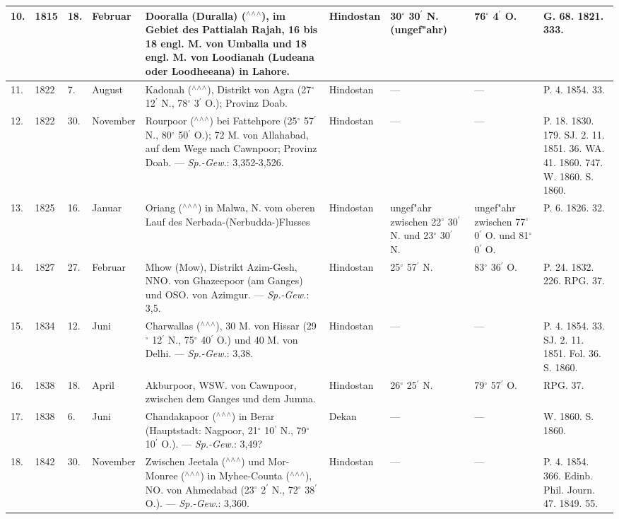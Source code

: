 \documentclass[a4paper, 8pt, oneside, polutonikogreek, german]{article}
\begin{document}
\begin{center}
\begin{longtable}{|p{3mm}|p{8mm}|p{5mm}|p{18mm}|p{25mm}|p{15mm}|p{13mm}|p{13mm}|p{13mm}|}
        10. & 1815 & 18. & Februar & Dooralla (Duralla) ($^\wedge$$^\wedge$$^\wedge$), im Gebiet des Pattialah Rajah, 16 bis 18 engl. M. von Umballa und 18 engl. M. von Loodianah (Ludeana oder Loodheeana) in Lahore. & Hindostan & 30$^\circ$ 30$^\prime$ N. (ungef"ahr) & 76$^\circ$ 4$^\prime$ O. & G. 68. 1821. 333. \\ \hline
        11. & 1822 & 7. & August & Kadonah ($^\wedge$$^\wedge$$^\wedge$), Distrikt von Agra (27$^\circ$ 12$^\prime$ N., 78$^\circ$ 3$^\prime$ O.); Provinz Doab. & Hindostan & --- & --- & P. 4. 1854. 33. \\ \hline
        12. & 1822 & 30. & November & Rourpoor ($^\wedge$$^\wedge$$^\wedge$) bei Fattehpore (25$^\circ$ 57$^\prime$ N., 80$^\circ$ 50$^\prime$ O.); 72 M. von Allahabad, auf dem Wege nach Cawnpoor; Provinz Doab. --- \emph{Sp.-Gew.}: 3,352-3,526. & Hindostan & --- & --- & P. 18. 1830. 179. SJ. 2. 11. 1851. 36. WA. 41. 1860. 747. W. 1860. S. 1860. \\ \hline
        13. & 1825 & 16. & Januar & Oriang ($^\wedge$$^\wedge$$^\wedge$) in Malwa, N. vom oberen Lauf des Nerbada-(Nerbudda-)Flusses & Hindostan & ungef"ahr zwischen 22$^\circ$ 30$^\prime$ N. und 23$^\circ$ 30$^\prime$ N. & ungef"ahr zwischen 77$^\circ$ 0$^\prime$ O. und 81$^\circ$ 0$^\prime$ O. & P. 6. 1826. 32. \\ \hline
        14. & 1827 & 27. & Februar & Mhow (Mow), Distrikt Azim-Gesh, NNO. von Ghazeepoor (am Ganges) und OSO. von Azimgur. --- \emph{Sp.-Gew.}: 3,5. & Hindostan & 25$^\circ$ 57$^\prime$ N. & 83$^\circ$ 36$^\prime$ O. & P. 24. 1832. 226. RPG. 37. \\ \hline
        15. & 1834 & 12. & Juni & Charwallas ($^\wedge$$^\wedge$$^\wedge$), 30 M. von Hissar (29$^\circ$ 12$^\prime$ N., 75$^\circ$ 40$^\prime$ O.) und 40 M. von Delhi. --- \emph{Sp.-Gew.}: 3,38. & Hindostan & --- & --- & P. 4. 1854. 33. SJ. 2. 11. 1851. Fol. 36. S. 1860. \\ \hline
        16. & 1838 & 18. & April & Akburpoor, WSW. von Cawnpoor, zwischen dem Ganges und dem Jumna. & Hindostan & 26$^\circ$ 25$^\prime$ N. & 79$^\circ$ 57$^\prime$ O. & RPG. 37. \\ \hline
        17. & 1838 & 6. & Juni & Chandakapoor ($^\wedge$$^\wedge$$^\wedge$) in Berar (Hauptstadt: Nagpoor, 21$^\circ$ 10$^\prime$ N., 79$^\circ$ 10$^\prime$ O.). --- \emph{Sp.-Gew.}: 3,49? & Dekan & --- & --- & W. 1860. S. 1860. \\ \hline
        18. & 1842 & 30. & November & Zwischen Jeetala ($^\wedge$$^\wedge$$^\wedge$) und Mor-Monree ($^\wedge$$^\wedge$$^\wedge$) in Myhee-Counta ($^\wedge$$^\wedge$$^\wedge$), NO. von Ahmedabad (23$^\circ$ 2$^\prime$ N., 72$^\circ$ 38$^\prime$ O.). --- \emph{Sp.-Gew.}: 3,360. & Hindostan & --- & --- & P. 4. 1854. 366. Edinb. Phil. Journ. 47. 1849. 55. \\ \hline

\end{longtable}
\end{center}
\end{document}
